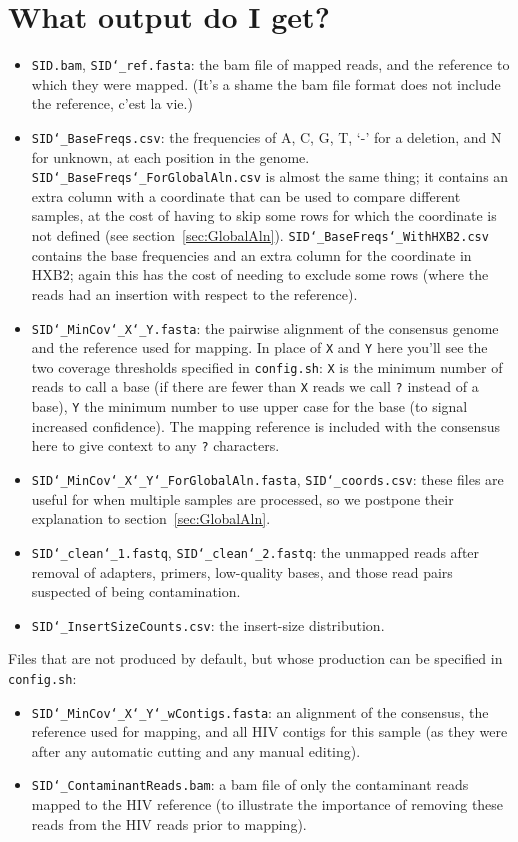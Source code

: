 \documentclass{article}
\let\c\texttt
\begin{document}
\section{What output do I get?}
\begin{itemize}
\item \c{SID.bam}, \c{SID\char`_ref.fasta}: the bam file of mapped reads, and the reference to which they were mapped.
(It's a shame the bam file format does not include the reference, c'est la vie.)
\item \c{SID\char`_BaseFreqs.csv}: the frequencies of A, C, G, T, `-' for a deletion, and N for unknown, at each position in the genome.
\c{SID\char`_BaseFreqs\char`_ForGlobalAln.csv} is almost the same thing; it contains an extra column with a coordinate that can be used to compare different samples, at the cost of having to skip some rows for which the coordinate is not defined (see section~\ref{sec:GlobalAln}).
\c{SID\char`_BaseFreqs\char`_WithHXB2.csv} contains the base frequencies and an extra column for the coordinate in HXB2; again this has the cost of needing to exclude some rows (where the reads had an insertion with respect to the reference).
\item \c{SID\char`_MinCov\char`_X\char`_Y.fasta}: the pairwise alignment of the consensus genome and the reference used for mapping.
In place of \c{X} and \c{Y} here you'll see the two coverage thresholds specified in \c{config.sh}: \c{X} is the minimum number of reads to call a base (if there are fewer than \c{X} reads we call \c{?} instead of a base), \c{Y} the minimum number to use upper case for the base (to signal increased confidence).
The mapping reference is included with the consensus here to give context to any \c{?} characters.
\item \c{SID\char`_MinCov\char`_X\char`_Y\char`_ForGlobalAln.fasta}, \c{SID\char`_coords.csv}: these files are useful for when multiple samples are processed, so we postpone their explanation to section~\ref{sec:GlobalAln}.  
\item \c{SID\char`_clean\char`_1.fastq}, \c{SID\char`_clean\char`_2.fastq}: the unmapped reads after removal of adapters, primers, low-quality bases, and those read pairs suspected of being contamination.  
\item \c{SID\char`_InsertSizeCounts.csv}: the insert-size distribution.
\end{itemize}


Files that are not produced by default, but whose production can be specified in \c{config.sh}:
\begin{itemize}
\item \c{SID\char`_MinCov\char`_X\char`_Y\char`_wContigs.fasta}: an alignment of the consensus, the reference used for mapping, and all HIV contigs for this sample (as they were after any automatic cutting and any manual editing).
\item \c{SID\char`_ContaminantReads.bam}: a bam file of only the contaminant reads mapped to the HIV reference (to illustrate the importance of removing these reads from the HIV reads prior to mapping).
\end{itemize}
\end{document}
